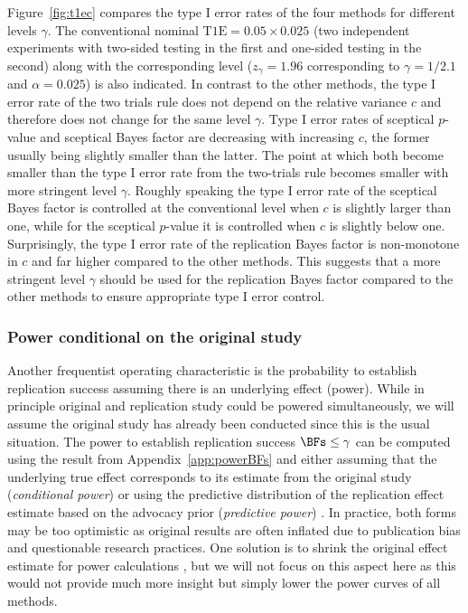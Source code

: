 Figure~\ref{fig:t1ec} compares the type I error rates of the four methods for
different levels $\gamma$. The conventional nominal
$\text{T1E} = 0.05 \times 0.025$ (two independent experiments with two-sided
testing in the first and one-sided testing in the second) along with the
corresponding level ($z_{\gamma} = 1.96$ corresponding to $\gamma = 1/2.1$ and
$\alpha = 0.025$) is also indicated. In contrast to the other methods, the type
I error rate of the two trials rule does not depend on the relative variance $c$
and therefore does not change for the same level $\gamma$. Type I error rates of
sceptical $p$-value and sceptical Bayes factor are decreasing with increasing
$c$, the former usually being slightly smaller than the latter. The point at
which both become smaller than the type I error rate from the two-trials rule
becomes smaller with more stringent level $\gamma$. Roughly speaking the type I
error rate of the sceptical Bayes factor is controlled at the conventional level
when $c$ is slightly larger than one, while for the sceptical $p$-value it is
controlled when $c$ is slightly below one. Surprisingly, the type I error rate
of the replication Bayes factor is non-monotone in $c$ and far higher compared
to the other methods. This suggests that a more stringent level $\gamma$ should
be used for the replication Bayes factor compared to the other methods to ensure
appropriate type I error control.


\subsubsection{Power conditional on the original study}
Another frequentist operating characteristic is the probability to establish
replication success assuming there is an underlying effect (power). While in
principle original and replication study could be powered simultaneously, we
will assume the original study has already been conducted since this is the
usual situation. The power to establish replication success $\BFs \leq \gamma$
can be computed using the result from Appendix~\ref{app:powerBFs} and either
assuming that the underlying true effect corresponds to its estimate from the
original study (\emph{conditional power}) or using the predictive distribution
of the replication effect estimate based on the advocacy prior (\emph{predictive
  power}) \citep{Spiegelhalter1986b, Micheloud2020}. In practice, both forms may
be too optimistic as original results are often inflated due to publication bias
and questionable research practices. One solution is to shrink the original
effect estimate for power calculations \citep{Pawel2020, Held2021}, but we will
not focus on this aspect here as this would not provide much more insight but
simply lower the power curves of all methods.


